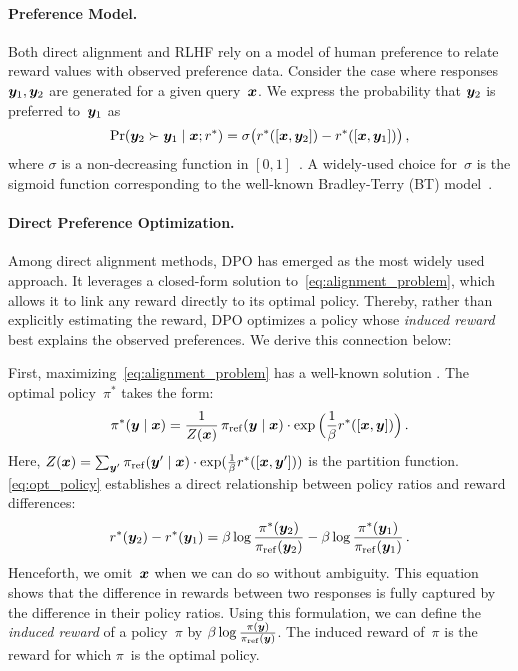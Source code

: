 \paragraph{Preference Model.}
Both direct alignment and RLHF rely on a model of human preference to relate reward values with observed preference data. 
Consider the case where responses~${\bm{y}}_1, {\bm{y}}_2$ are generated for a given query~${\bm{x}}$. We express the probability that ${\bm{y}}_2$ is preferred to~${\bm{y}}_1$ as
%
\begin{equation}
\label{eq:BT}
    \Pr({\bm{y}}_2 \succ {\bm{y}}_1 \mid {\bm{x}}; r^*) = \sigma\big(r^*([{\bm{x}}, {\bm{y}}_2]) - r^*([{\bm{x}}, {\bm{y}}_1])\big)
    \,,
\end{equation}
%
where $\sigma$ is a non-decreasing function in $[0, 1]$~\citep{thurstone1927law,luce1959individual,yellott1977relationship}. A widely-used choice for~$\sigma$ is the sigmoid function corresponding to the well-known Bradley-Terry (BT) model~\citep{bt}. 


\paragraph{Direct Preference Optimization.}
Among direct alignment methods, DPO has emerged as the most widely used approach. It leverages a closed-form solution to~\cref{eq:alignment_problem}, which allows it to link any reward directly to its optimal policy. Thereby, rather than explicitly estimating the reward, DPO optimizes a policy whose \emph{induced reward} best explains the observed preferences. We derive this connection below:

First, maximizing~\cref{eq:alignment_problem} has a well-known solution \citep{ziebart2010modeling}. The optimal policy~$\pi^*$ takes the form:
%
\begin{equation}
\label{eq:opt_policy}
    \pi^*({\bm{y}} \mid {\bm{x}}) = \frac{1}{Z({\bm{x}})} \, \pi_{\rm ref}({\bm{y}} \mid {\bm{x}}) \cdot \exp\Big(\frac{1}{\beta}  r^*([{\bm{x}}, {\bm{y}}])\Big)
    \,.
\end{equation}
%
Here, $Z({\bm{x}}) = \sum_{{\bm{y}}'} \pi_{\rm ref}({\bm{y}}' \mid {\bm{x}}) \cdot \exp(\frac{1}{\beta}  r^*([{\bm{x}}, {\bm{y}}']))$ is the partition function. \cref{eq:opt_policy} establishes a direct relationship between policy ratios and reward differences:
%
\begin{equation}
\label{eq:diff_of_rew}
    r^*({\bm{y}}_2) - r^*({\bm{y}}_1) = \beta \log\frac{\pi^*({\bm{y}}_2)}{\pi_{\rm ref}({\bm{y}}_2)} - \beta \log\frac{\pi^*({\bm{y}}_1)}{\pi_{\rm ref}({\bm{y}}_1)}
    \,.
\end{equation}
%
Henceforth, we omit~${\bm{x}}$ when we can do so without ambiguity. This equation shows that the difference in rewards between two responses is fully captured by the difference in their policy ratios. 
Using this formulation, we can define the \emph{induced reward} of a policy~$\pi$ by $\beta \log\frac{\pi({\bm{y}})}{\pi_{\rm ref}({\bm{y}})}$.  The induced reward of~$\pi$ is the reward for which $\pi$~is the optimal policy.

